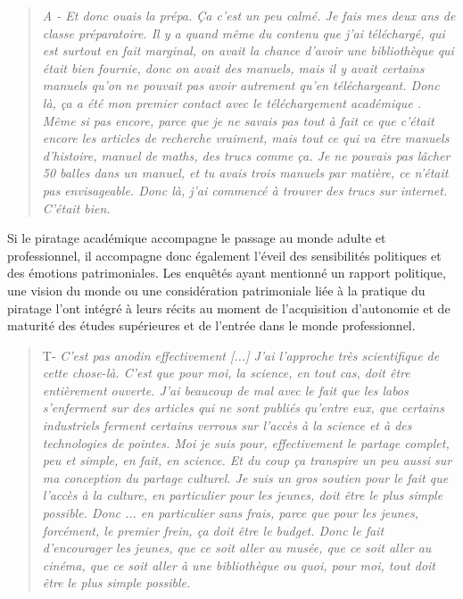 \begin{quote}
    \textit{A - Et donc ouais la prépa. Ça c'est un peu calmé. Je fais mes deux ans de classe préparatoire. Il y a quand même du contenu que j'ai téléchargé, qui est surtout en fait marginal, on avait la chance d'avoir une bibliothèque qui était bien fournie, donc on avait des manuels, mais il y avait certains manuels qu'on ne pouvait pas avoir autrement qu'en téléchargeant. Donc là, ça a été mon premier contact avec le téléchargement académique . Même si pas encore, parce que je ne savais pas tout à fait ce que c'était encore les articles de recherche vraiment, mais tout ce qui va être manuels d'histoire, manuel de maths, des trucs comme ça. Je ne pouvais pas lâcher 50 balles dans un manuel, et tu avais trois manuels par matière, ce n'était pas envisageable. Donc là, j'ai commencé à trouver des trucs sur internet. C'était bien.}
\end{quote}

Si le piratage académique accompagne le passage au monde adulte et professionnel, il accompagne donc également l'éveil des sensibilités politiques et des émotions patrimoniales. Les enquêtés ayant mentionné un rapport politique, une vision du monde ou une considération patrimoniale liée à la pratique du piratage l'ont intégré à leurs récits au moment de l'acquisition d'autonomie et de maturité des études supérieures et de l'entrée dans le monde professionnel. 

\begin{quote}
    T- \textit{C'est pas anodin effectivement [...] J'ai l'approche très scientifique de cette chose-là. C'est que pour moi, la science, en tout cas, doit être entièrement ouverte. J'ai beaucoup de mal avec le fait que les labos s'enferment sur des articles qui ne sont publiés qu'entre eux, que certains industriels ferment certains verrous sur l'accès à la science et à des technologies de pointes. Moi je suis pour, effectivement le partage complet, peu et simple, en fait, en science. Et du coup ça transpire un peu aussi sur ma conception du partage culturel. Je suis un gros soutien pour le fait que l'accès à la culture, en particulier pour les jeunes, doit être le plus simple possible. Donc ... en particulier sans frais, parce que pour les jeunes, forcément, le premier frein, ça doit être le budget. Donc le fait d'encourager les jeunes, que ce soit aller au musée, que ce soit aller au cinéma, que ce soit aller à une bibliothèque ou quoi, pour moi, tout doit être le plus simple possible.}
\end{quote}

